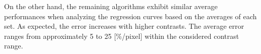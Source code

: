 			
			On the other hand, the remaining algorithms exhibit similar average performances when analyzing the regression curves based on the averages of each set. As expected, the error increases with higher contrasts. The average error ranges from approximately 5 to 25 [\%/pixel] within the considered contrast range.
			
